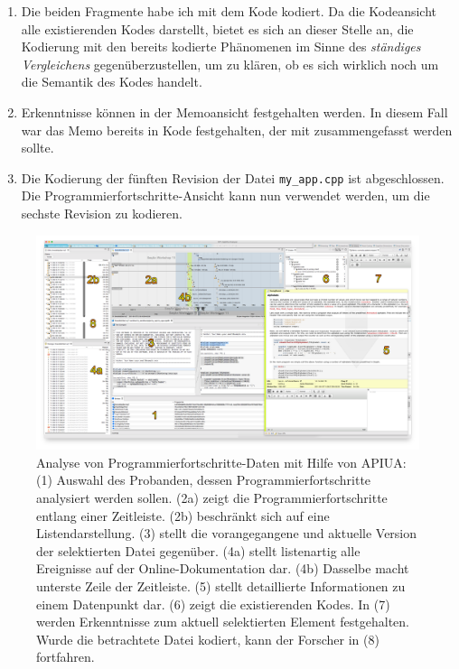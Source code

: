 \begin{enumerate}
  \item Die beiden Fragmente habe ich mit dem Kode  kodiert. Da die Kodeansicht alle existierenden Kodes darstellt, bietet es sich an dieser Stelle an, die Kodierung mit den bereits kodierte Phänomenen im Sinne des \textit{ständiges Vergleichens} gegenüberzustellen, um zu klären, ob es sich wirklich noch um die Semantik des Kodes handelt.
  \item Erkenntnisse können in der Memoansicht festgehalten werden. In diesem Fall war das Memo bereits in Kode  festgehalten, der mit  zusammengefasst werden sollte.
  \item Die Kodierung der fünften Revision der Datei \texttt{my\_app.cpp} ist abgeschlossen. Die Programmierfortschritte-Ansicht kann nun verwendet werden, um die sechste Revision zu kodieren.
\end{enumerate}

\thispagestyle{empty}
\begin{landscape}
\begin{figure}
  \centering
    \includegraphics[width=1.0\linewidth]{Figures/research/workflow-diff.png}
  \caption[Analyse von Programmierfortschritte-Daten mit Hilfe von APIUA]{Analyse von Programmierfortschritte-Daten mit Hilfe von APIUA: (1) Auswahl des Probanden, dessen Programmierfortschritte analysiert werden sollen. (2a) zeigt die Programmierfortschritte entlang einer Zeitleiste. (2b) beschränkt sich auf eine Listendarstellung. (3) stellt die vorangegangene und aktuelle Version der selektierten Datei gegenüber. (4a) stellt listenartig alle Ereignisse auf der Online-Dokumentation dar. (4b) Dasselbe macht unterste Zeile der Zeitleiste. (5) stellt detaillierte Informationen zu einem Datenpunkt dar. (6) zeigt die existierenden Kodes. In (7) werden Erkenntnisse zum aktuell selektierten Element festgehalten. Wurde die betrachtete Datei kodiert, kann der Forscher in (8) fortfahren.}
  \label{fig:research-workflow-diff}
\end{figure}
\end{landscape}
\restoregeometry


